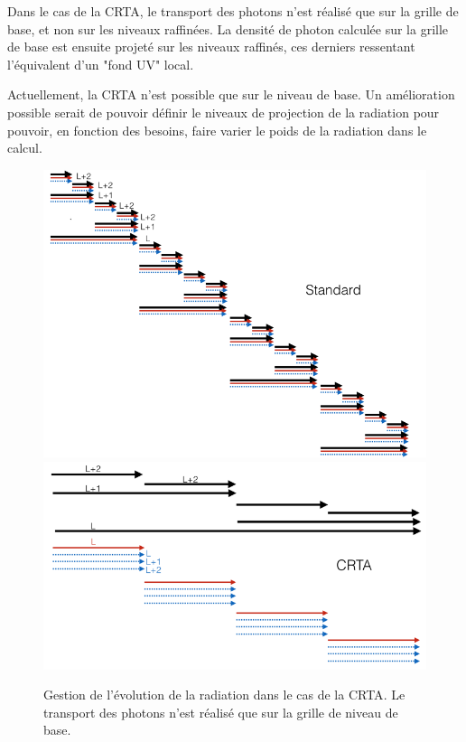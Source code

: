 Dans le cas de la \ac{CRTA}, le transport des photons n'est réalisé que sur la grille de base, et non sur les niveaux raffinées.
La densité de photon calculée sur la grille de base est ensuite projeté sur les niveaux raffinés, ces derniers ressentant l'équivalent d'un "fond UV" local.


Actuellement, la \ac{CRTA} n'est possible que sur le niveau de base.
Un amélioration possible serait de pouvoir définir le niveaux de projection de la radiation pour pouvoir, en fonction des besoins, faire varier le poids de la radiation dans le calcul.


\begin{figure}
\includegraphics[width=.95\linewidth]{img/02/revz_crad_std.png}
\includegraphics[width=.95\linewidth]{img/02/revz_crad.png}
\caption[CRTA]{Gestion de l'évolution de la radiation dans le cas de la \ac{CRTA}.
Le transport des photons n'est réalisé que sur la grille de niveau de base.
\label{fig:CRTA}}
\end{figure}
